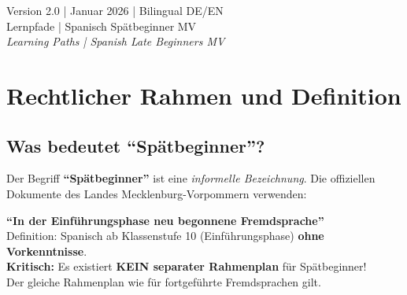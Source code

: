 \documentclass[10pt,a4paper]{article}
\begin{document}
\begin{titlepage}
\begin{center}

\vfill

{\small Version 2.0 | Januar 2026 | Bilingual DE/EN}\\
{\footnotesize Lernpfade | Spanisch Spätbeginner MV}\\
{\scriptsize\color{englishgray}\textit{Learning Paths | Spanish Late Beginners MV}}

\end{center}
\end{titlepage}

\tableofcontents
\newpage


\section{Rechtlicher Rahmen und Definition}

\subsection{Was bedeutet ``Spätbeginner''?}

Der Begriff \textbf{``Spätbeginner''} ist eine \textit{informelle Bezeichnung}. Die offiziellen Dokumente des Landes Mecklenburg-Vorpommern verwenden:

\begin{wichtigbox}
\textbf{``In der Einführungsphase neu begonnene Fremdsprache''}\\[4pt]
Definition: Spanisch ab Klassenstufe 10 (Einführungsphase) \textbf{ohne Vorkenntnisse}.\\[4pt]
\textbf{Kritisch:} Es existiert \textbf{KEIN separater Rahmenplan} für Spätbeginner!\\
Der gleiche Rahmenplan wie für fortgeführte Fremdsprachen gilt.
\end{wichtigbox}
\end{document}
